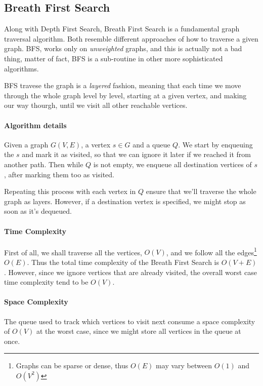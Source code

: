 \documentclass[12pt]{article}
\begin{document}
\subsection{Breath First Search}

Along with Depth First Search, Breath First Search is a fundamental graph traversal algorithm. Both resemble different approaches of how to traverse a given graph. BFS, works only on \textit{unweighted} graphs, and this is actually not a bad thing, matter of fact, BFS is a sub-routine in other more sophisticated algorithms.

BFS travese the graph is a \textit{layered} fashion, meaning that each time we move through the whole graph level by level, starting at a given vertex, and making our way thourgh, until we visit all other reachable vertices.

\paragraph{Algorithm details} Given a graph $G(V,E)$, a vertex $s \in G$ and a queue $Q$. We start by enqueuing the $s$ and mark it as visited, so that we can ignore it later if we reached it from another path. Then while $Q$ is not empty, we enqueue all destination vertices of $s$, after marking them too as visited.

Repeating this process with each vertex in $Q$ ensure that we'll traverse the whole graph as layers. However, if a destination vertex is specified, we might stop as soon as it's dequeued.

\paragraph{Time Complexity} First of all, we shall traverse all the vertices, $O(V)$, and we follow all the edges\footnote{Graphs can be sparse or dense, thus $O(E)$ may vary between $O(1)$ and $O(V^2)$} $O(E)$. Thus the total time complexity of the Breath First Search is $O(V+E)$. However, since we ignore vertices that are already visited, the overall worst case time complexity tend to be $O(V)$.

\paragraph{Space Complexity} The queue used to track which vertices to visit next consume a space complexity of $O(V)$ at the worst case, since we might store all vertices in the queue at once.
\end{document}
